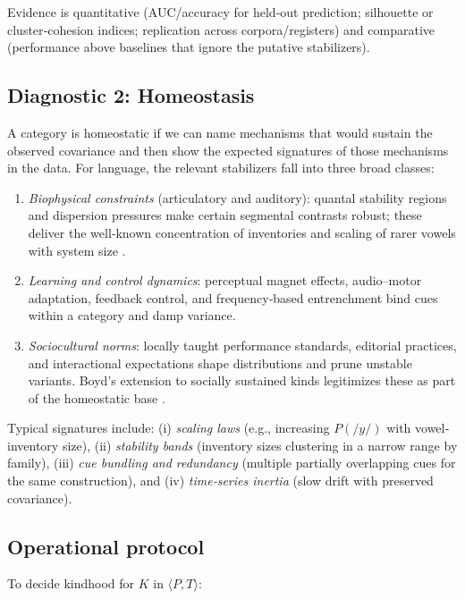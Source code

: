 \documentclass[12pt]{article}
\begin{document}
Evidence is quantitative (AUC/accuracy for held‐out prediction; silhouette or cluster‐cohesion indices; replication across corpora/registers) and comparative (performance above baselines that ignore the putative stabilizers).

\subsection{Diagnostic 2: Homeostasis}\label{sec:homeostasis}

A category is homeostatic if we can name mechanisms that would sustain the observed covariance and then show the expected signatures of those mechanisms in the data. For language, the relevant stabilizers fall into three broad classes:

\begin{enumerate}
\item \textit{Biophysical constraints} (articulatory and auditory): quantal stability regions and dispersion pressures make certain segmental contrasts robust; these deliver the well‐known concentration of inventories and scaling of rarer vowels with system size \citep[their Fig.~1 and Fig.~2; Table~1]{Ekstrom2025PhonemeTool}.
\item \textit{Learning and control dynamics}: perceptual magnet effects, audio–motor adaptation, feedback control, and frequency‐based entrenchment bind cues within a category and damp variance.
\item \textit{Sociocultural norms}: locally taught performance standards, editorial practices, and interactional expectations shape distributions and prune unstable variants. Boyd’s extension to socially sustained kinds legitimizes these as part of the homeostatic base \citep{Boyd2000Workmanship}.
\end{enumerate}

Typical signatures include: (i) \emph{scaling laws} (e.g., increasing $P(\textit{/y/})$ with vowel‐inventory size), (ii) \emph{stability bands} (inventory sizes clustering in a narrow range by family), (iii) \emph{cue bundling and redundancy} (multiple partially overlapping cues for the same construction), and (iv) \emph{time‐series inertia} (slow drift with preserved covariance).

\subsection{Operational protocol}

To decide kindhood for $K$ in $\langle P,T\rangle$:
\end{document}
